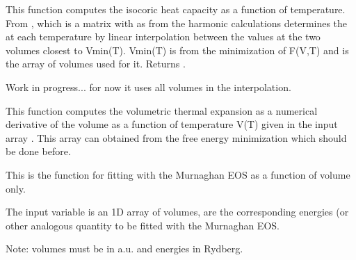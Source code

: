 \documentclass[letterpaper,10pt,english]{sphinxmanual}
\begin{document}

\begin{fulllineitems}
\label{pyqha:pyqha.eos.compute_Cv}
This function computes the isocoric heat capacity as a function of temperature.
From , which is a matrix with  as from the harmonic calculations
determines the  at each temperature by linear interpolation between the values
at the two volumes closest to Vmin(T). Vmin(T) is from the minimization of F(V,T)
and  is the array of volumes used for it.
Returns .

Work in progress... for now it uses all volumes in the interpolation.

\end{fulllineitems}


\begin{fulllineitems}
\label{pyqha:pyqha.eos.compute_beta}
This function computes the volumetric thermal expansion as a numerical
derivative of the volume as a function of temperature V(T) given in the
input array . This array can obtained
from the free energy minimization which should be done before.

\end{fulllineitems}


\begin{fulllineitems}
\label{pyqha:pyqha.eos.fit_Murn}
This is the function for fitting with the Murnaghan EOS as a function of volume only.

The input variable  is an 1D array of volumes,  are the corresponding 
energies (or other analogous quantity to be fitted with the Murnaghan EOS.

Note: volumes must be in a.u. and energies in Rydberg.

\end{fulllineitems}
\end{document}
